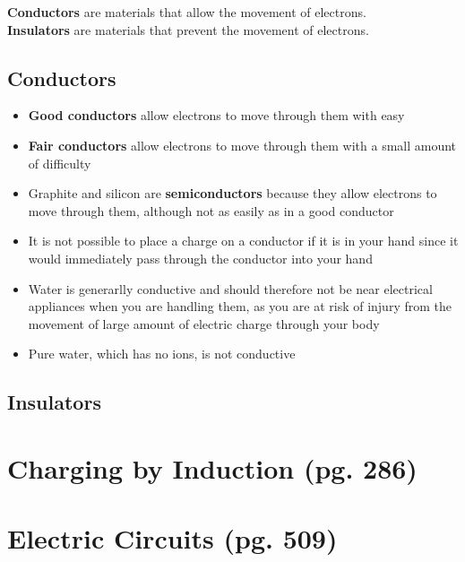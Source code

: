 \documentclass{article}
\begin{document}
    \textbf{Conductors} are materials that allow the movement of electrons.\\
    \textbf{Insulators} are materials that prevent the movement of electrons.\\
    
    \subsection*{Conductors}
    \begin{itemize}
        \item \textbf{Good conductors} allow electrons to move through them with easy
        \item \textbf{Fair conductors} allow electrons to move through them with a small amount of difficulty
        

        \item Graphite and silicon are \textbf{semiconductors} because they allow electrons to move through them, although not as easily as in a good conductor
        \item It is not possible to place a charge on a conductor if it is in your hand since it would immediately pass through the conductor into your hand
        \item Water is generarlly conductive and should therefore not be near electrical appliances when you are handling them, as you are at risk of injury from the movement of large amount of electric charge through your body
        \item Pure water, which has no ions, is not conductive
    \end{itemize}

    \subsection*{Insulators}


\section{Charging by Induction (pg. 286)}


\section{Electric Circuits (pg. 509)}
\end{document}
